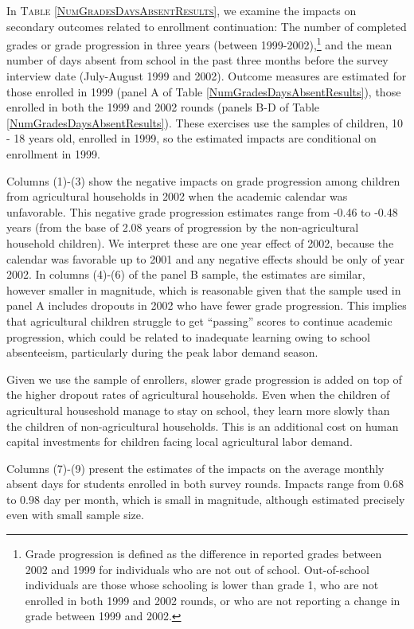 \documentclass[12pt,letterpaper]{article}
\newcommand{\0}{\ensuremath{\mbox{\boldmath $0$}}}
\begin{document}
In \textsc{\small Table \ref{NumGradesDaysAbsentResults}}, we examine the impacts on secondary outcomes related to enrollment continuation: The number of completed grades or grade progression in three years (between 1999-2002),\footnote{Grade progression is defined as the difference in reported grades between 2002 and 1999 for individuals who are not out of school. Out-of-school individuals are those whose schooling is lower than grade 1, who are not enrolled in both 1999 and 2002 rounds, or who are not reporting a change in grade between 1999 and 2002. } and the mean number of days absent from school in the past three months before the survey interview date (July-August 1999 and 2002). Outcome measures are estimated for those enrolled in 1999 (panel A of Table \ref{NumGradesDaysAbsentResults}), those enrolled in both the 1999 and 2002 rounds (panels B-D of Table \ref{NumGradesDaysAbsentResults}). These exercises use the samples of children, 10 - 18 years old, enrolled in 1999, so the estimated impacts are conditional on enrollment in 1999.

Columns (1)-(3) show the negative impacts on grade progression among children from agricultural households in 2002 when the academic calendar was unfavorable. This negative grade progression estimates range from -0.46 to -0.48 years (from the base of 2.08 years of progression by the non-agricultural household children). We interpret these are one year effect of 2002, because the calendar was favorable up to 2001 and any negative effects should be only of year 2002. 
In columns (4)-(6) of the panel B sample, the estimates are similar, however smaller in magnitude, which is reasonable given that the sample used in panel A includes dropouts in 2002 who have fewer grade progression. This implies that agricultural children struggle to get ``passing'' scores to continue academic progression, which could be related to inadequate learning owing to school absenteeism, particularly during the peak labor demand season. 

Given we use the sample of enrollers, slower grade progression is added on top of the higher dropout rates of agricultural households. Even when the children of agricultural houseshold manage to stay on school, they learn more slowly than the children of non-agricultural households. This is an additional cost on human capital investments for children facing local agricultural labor demand.

Columns (7)-(9) present the estimates of the impacts on the average monthly absent days for students enrolled in both survey rounds. Impacts range from 0.68 to 0.98 day per month, which is small in magnitude, although estimated precisely even with small sample size. 
\end{document}
